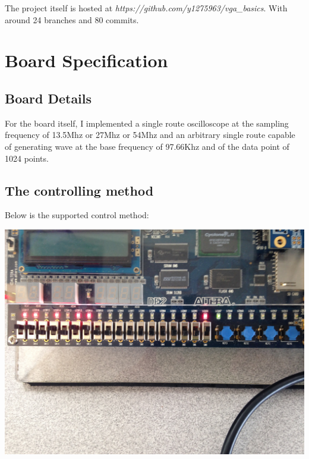 \documentclass[11pt]{scrartcl}
\begin{document}
The project itself is hosted at \textit{https://github.com/y1275963/vga\_basics}. With around 24 branches and 80 commits.\\


\section{Board Specification}
\subsection{Board Details}
For the board itself, I implemented a single route oscilloscope at the sampling frequency of 13.5Mhz or 27Mhz or 54Mhz and an arbitrary single route capable of generating wave at the base frequency of 97.66Khz and of the data point of 1024 points.%
\subsection{The controlling method}

Below is the supported control method:

\begin{center}     
\begin{minipage}[t]{\linewidth}

{
\includegraphics[scale = 0.08]{control.JPG}
}
\end{minipage}
\medskip
\end{center}
\end{document}
